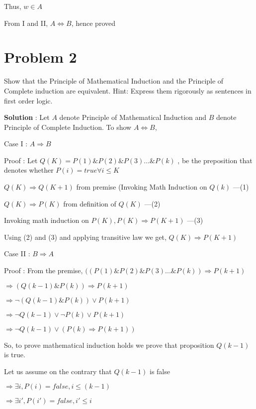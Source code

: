 \documentclass{article}
\begin{document}
    \qquad Thus, $w \in A$
    
    \quad From I and II, $A \iff B$, hence proved
    
    
    \section*{Problem 2} Show that the Principle of Mathematical Induction and the Principle of Complete induction are equivalent.
Hint: Express them rigorously as sentences in first order logic.

    \textbf{Solution} : 
    Let $A$ denote Principle of Mathematical Induction and $B$ denote Principle of Complete Induction. To show $A \iff B$,
    
    Case I : $A \Longrightarrow B$
    
    Proof : Let $Q(K) = P(1) \& P(2) \& P(3) ... \& P(k)$ , be the preposition that denotes whether $P(i) = true \forall i \leq K$
    
    \quad $Q(K) \Longrightarrow Q(K + 1)$ from premise (Invoking Math Induction on $Q(k)$ ---(1)
    
    \quad $Q(K) \Longrightarrow P(K)$ from definition of $Q(K)$ ---(2)
    
    \quad Invoking math induction on $P(K),  P(K) \Longrightarrow P(K + 1)$ ---(3)
    
    \quad Using (2) and (3) and applying transitive law we get, $Q(K) \Longrightarrow P(K + 1)$
    
    Case II : $B \Longrightarrow A$
    
    Proof : From the premise, $((P(1) \& P(2) \& P(3) ... \& P(k)) \Longrightarrow P(k + 1)$
    
    \quad $\Longrightarrow (Q(k - 1) \& P(k)) \Longrightarrow P(k + 1)$
    
    \quad $\Longrightarrow \neg (Q(k - 1) \& P(k)) \lor P(k+1)$

    \quad $\Longrightarrow \neg Q(k - 1) \lor \neg P(k) \lor P(k+1)$

    \quad $\Longrightarrow \neg Q(k - 1) \lor (P(k) \Longrightarrow P(k + 1))$
    
    \quad So, to prove mathematical induction holds we prove that proposition $Q(k - 1)$ is true.
    
    \quad Let us assume on the contrary that $Q(k - 1)$ is false
    
    \quad $\Longrightarrow \exists i, P(i) = false, i \leq (k - 1)$
    
    \quad $\Longrightarrow \exists i', P(i') = false, i' \leq i$
    
\end{document}
